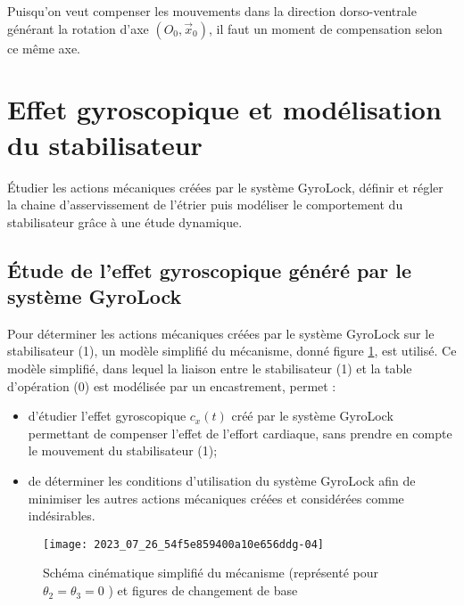 \ifprof
\begin{corrige}
Puisqu'on veut compenser les mouvements dans la direction dorso-ventrale générant la rotation d'axe $\left( O_0,\overrightarrow{x}_0 \right)$, il faut un moment de compensation selon ce même axe.
\end{corrige}
\else
\fi

\section{Effet gyroscopique et modélisation du stabilisateur}
\begin{obj}
Étudier les actions mécaniques créées par le système GyroLock, définir et régler la chaine d'asservissement de l'étrier puis modéliser le comportement du stabilisateur grâce à une étude dynamique.
\end{obj}

\subsection{\label{sec:IIA} Étude de l'effet gyroscopique généré par le système GyroLock}
Pour déterminer les actions mécaniques créées par le système GyroLock sur le stabilisateur (1), un modèle simplifié du mécanisme, donné figure \ref{fig_ccspsi2022:06}, est utilisé. Ce modèle simplifié, dans lequel la liaison entre le stabilisateur (1) et la table d'opération (0) est modélisée par un encastrement, permet :

\begin{itemize}
  \item d'étudier l'effet gyroscopique $c_{x}(t)$ créé par le système GyroLock permettant de compenser l'effet de l'effort cardiaque, sans prendre en compte le mouvement du stabilisateur (1);

  \item de déterminer les conditions d'utilisation du système GyroLock afin de minimiser les autres actions mécaniques créées et considérées comme indésirables.
\end{itemize}


\begin{figure}[!h]
\centering
\texttt{[image: 2023\_07\_26\_54f5e859400a10e656ddg-04]}
\caption{\label{fig_ccspsi2022:06}Schéma cinématique simplifié du mécanisme (représenté pour $\theta_{2}=\theta_{3}=0$ ) et figures de changement de base}
\end{figure}

